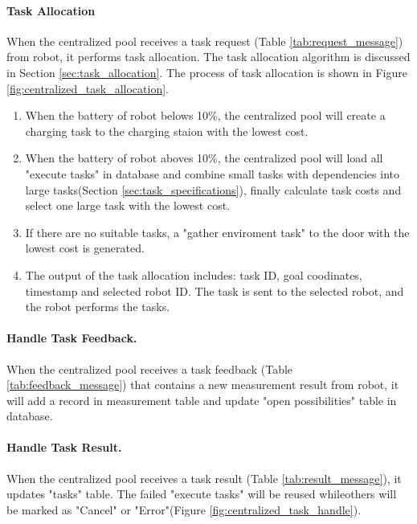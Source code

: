 \paragraph{Task Allocation}
When the centralized pool receives a task request (Table \ref{tab:request_message}) from robot, it performs task allocation. The task allocation algorithm is discussed in Section \ref{sec:task_allocation}. The process of task allocation is shown in Figure \ref{fig:centralized_task_allocation}. 
\begin{enumerate}
	\item When the battery of robot belows 10\%, the centralized pool will create a charging task to the charging staion with the lowest cost.
	\item When the battery of robot aboves 10\%, the centralized pool will load all "execute tasks" in database and combine small tasks with dependencies into large tasks(Section \ref{sec:task_specifications}), finally calculate task costs and select one large task with the lowest cost. 
    \item If there are no suitable tasks, a "gather enviroment task" to the door with the lowest cost is generated. 
    \item The output of the task allocation includes: task ID, goal coodinates, timestamp and selected robot ID. The task is sent to the selected robot, and the robot performs the tasks.

\end{enumerate}

\paragraph{Handle Task Feedback.}
When the centralized pool receives a task feedback (Table \ref{tab:feedback_message}) that contains a new measurement result from robot, it will add a record in measurement table and update "open possibilities" table in database.

\paragraph{Handle Task Result.}
When the centralized pool receives a task result (Table \ref{tab:result_message}), it updates "tasks" table. The failed "execute tasks" will be reused whileothers will be marked as "Cancel" or "Error"(Figure \ref{fig:centralized_task_handle}).

